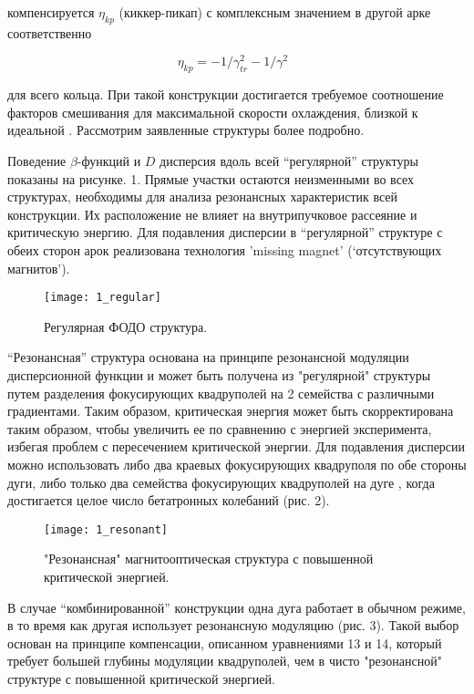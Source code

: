\noindent компенсируется $\eta_{kp}$ (киккер-пикап) с комплексным значением в другой арке соответственно

\begin{equation}
\eta_{kp}=-1/\gamma_{tr}^2-1/\gamma^2\ \ \ 
\end{equation}

\noindent для всего кольца. При такой конструкции достигается требуемое соотношение факторов смешивания для максимальной скорости охлаждения, близкой к идеальной \cite{senichev:hesr}. Рассмотрим заявленные структуры более подробно.

\noindent Поведение $\beta$-функций и $D$ дисперсия вдоль всей “регулярной” структуры показаны на рисунке. 1. Прямые участки остаются неизменными во всех структурах, необходимы для анализа резонансных характеристик всей конструкции. Их расположение не влияет на внутрипучковое рассеяние и критическую энергию. Для подавления дисперсии в “регулярной” структуре с обеих сторон арок реализована технология 'missing magnet' (‘отсутствующих магнитов’).

\begin{figure}[!h]
  \centering
   \texttt{[image: 1\_regular]}
   \caption{Регулярная ФОДО структура.}
   \label{fig:1_regular}
\end{figure}

\noindent “Резонансная” структура основана на принципе резонансной модуляции дисперсионной функции \cite{senichev:construction} и может быть получена из "регулярной" структуры путем разделения фокусирующих квадруполей на 2 семейства с различными градиентами. Таким образом, критическая энергия может быть скорректирована таким образом, чтобы увеличить ее по сравнению с энергией эксперимента, избегая проблем с пересечением критической энергии. Для подавления дисперсии можно использовать либо два краевых фокусирующих квадруполя по обе стороны дуги, либо только два семейства фокусирующих квадруполей на дуге \cite{Kolokolchikov:2021trans}, когда достигается целое число бетатронных колебаний (рис. 2).

\begin{figure}[!h]
  \centering
   \texttt{[image: 1\_resonant]}
   \caption{"Резонансная" магнитооптическая структура с повышенной критической энергией.}
   \label{fig:1_resonant}
\end{figure}

\noindent В случае “комбинированной” конструкции одна дуга работает в обычном режиме, в то время как другая использует резонансную модуляцию (рис. 3). Такой выбор основан на принципе компенсации, описанном уравнениями 13 и 14, который требует большей глубины модуляции квадруполей, чем в чисто "резонансной" структуре с повышенной критической энергией.

